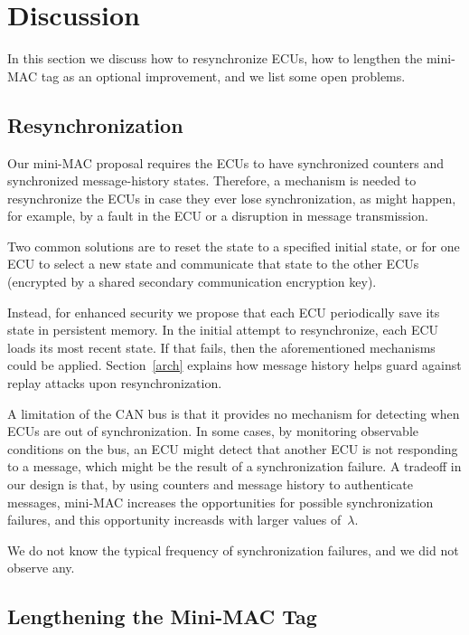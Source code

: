 \section{Discussion}
\label{discuss}

In this section we discuss how to resynchronize ECUs, 
how to lengthen the mini-MAC tag as an optional improvement, 
and we list some open problems.


\subsection{Resynchronization}
\label{resynch}

Our mini-MAC proposal requires the ECUs to have synchronized counters and synchronized message-history states.
Therefore, a mechanism is needed to resynchronize the ECUs in case they ever lose synchronization,
as might happen, for example, by a fault in the ECU or a disruption in message transmission.

Two common solutions are to reset the state to a specified initial state, or for one ECU to select
a new state and communicate that state to the other ECUs (encrypted by a shared secondary communication
encryption key).  

Instead, for enhanced security we propose that each ECU periodically save its state in persistent memory.  
In the initial attempt to resynchronize, each ECU loads its most recent state.  If that fails, then the aforementioned
mechanisms could be applied.  Section~\ref{arch} explains how message history helps guard against
replay attacks upon resynchronization.

A limitation of the CAN bus is that it provides no mechanism for detecting when ECUs are out
of synchronization.  In some cases, by monitoring observable conditions on the bus, 
an ECU might detect that another ECU is not responding to a message, which might be
the result of a synchronization failure.  A tradeoff in our design is that, by using
counters and message history to authenticate messages, 
mini-MAC increases the opportunities for possible synchronization failures,
and this opportunity increasds with larger values of~$\lambda$.

We do not know the typical frequency of synchronization failures,
and we did not observe any.

\subsection{Lengthening the Mini-MAC Tag}
\label{addingbits}

